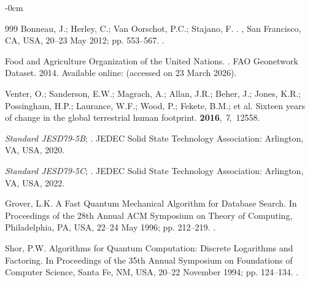 \documentclass[mathematics,article,accept,pdftex,moreauthors]{Definitions/mdpi}
\begin{document}
\begin{adjustwidth}{-\extralength}{0cm}
\begin{thebibliography}{999}
Bonneau, J.; Herley, C.; {Van Oorschot}, P.C.; Stajano, F.
.
, San Francisco, CA, USA, 20--23 May 2012;  pp. 553--567.
.

{Food and Agriculture Organization of the United Nations}.
.
\newblock FAO Geonetwork Dataset.  2014.
\newblock Available online: \url{} (accessed on 23 March 2026).

Venter, O.; Sanderson, E.W.; Magrach, A.; Allan, J.R.; Beher, J.; Jones, K.R.; Possingham, H.P.; Laurance, W.F.; Wood, P.; Fekete, B.M.; et al.
\newblock Sixteen years of change in the global terrestrial human footprint.
 {\bf 2016}, {\em 7},~12558.

\emph{Standard JESD79-5B}; 
.
\newblock JEDEC Solid State Technology Association: Arlington, VA, USA,  2020.

\emph{Standard JESD79-5C}; 
.
\newblock JEDEC Solid State Technology Association: Arlington, VA, USA,  2022.

Grover, L.K.
\newblock A Fast Quantum Mechanical Algorithm for Database Search.
\newblock In Proceedings of the 28th Annual ACM Symposium on
  Theory of Computing, Philadelphia, PA, USA, 22--24 May 1996; pp. 212--219.
.

Shor, P.W.
\newblock Algorithms for Quantum Computation: Discrete Logarithms and
  Factoring.
\newblock In Proceedings of the 35th Annual Symposium on
  Foundations of Computer Science, Santa Fe, NM, USA, 20--22 November 1994; pp. 124--134.
.


\end{thebibliography}
\end{adjustwidth}
\end{document}

